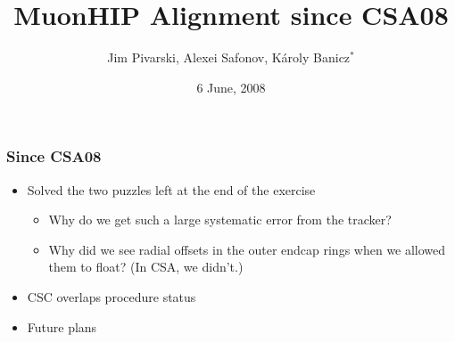 \documentclass[compress]{beamer}
\title{MuonHIP Alignment since CSA08}
\author{Jim Pivarski, Alexei Safonov, K\'aroly Banicz$^*$}
\institute{Texas A\&M University, $^*$FermiLab}
\date{ 6 June, 2008}
\begin{document}
\frame{\titlepage}


\begin{frame}
\frametitle{Since CSA08}
\begin{itemize}\setlength{\itemsep}{0.75 cm}
\item Solved the two puzzles left at the end of the exercise

\vspace{0.1 cm}
\begin{itemize}\setlength{\itemsep}{0.5 cm}
\item Why do we get such a large systematic error from the tracker?
\item Why did we see radial offsets in the outer endcap rings when we allowed them to float?  (In CSA, we didn't.)
\end{itemize}
\item CSC overlaps procedure status
\item Future plans
\end{itemize}
\end{frame}

\end{document}
